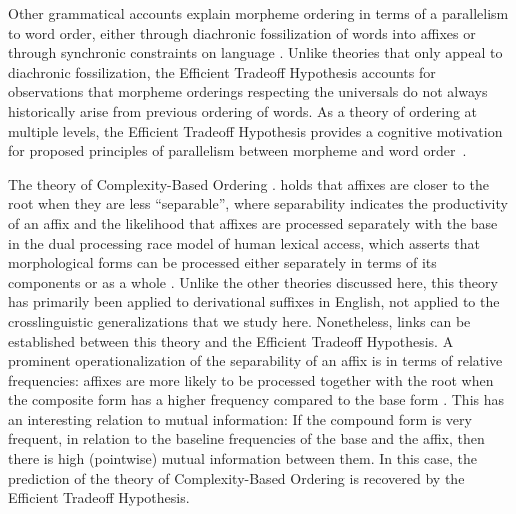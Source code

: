 \documentclass[11pt,letterpaper]{article}
\newcommand{\citep}{\parencite}
\newcommand{\citet}{\Textcite}
\newcommand\mhahn[1]{{\color{red}(#1)}}
\begin{document}





Other grammatical accounts explain morpheme ordering in terms of a parallelism to word order, either through diachronic fossilization of words into affixes or through synchronic constraints on language \citep{givon1971historical,venneman1973explanation,baker1985the}.
Unlike theories that only appeal to diachronic fossilization, the Efficient Tradeoff Hypothesis accounts for observations that morpheme orderings respecting the universals do not always historically arise from previous ordering of words.
As a theory of ordering at multiple levels, the Efficient Tradeoff Hypothesis  provides a cognitive motivation for proposed principles of parallelism between morpheme and word order~\citep{baker1985the}.



The theory of Complexity-Based Ordering \citep{hay2002speech,plag2002the,hay2004what,hay2005shifting,plag2009suffix}.
holds that affixes are closer to the root when they are less ``separable'', where separability indicates the productivity of an affix and the likelihood that affixes are processed separately with the base in the dual processing race model of human lexical access, which asserts that morphological forms can be processed either separately in terms of its components or as a whole  \citep{baayen1993on}.
Unlike the other theories discussed here, this theory has primarily been applied to derivational suffixes in English, not applied to the crosslinguistic generalizations that we study here.
Nonetheless, links can be established between this theory and the Efficient Tradeoff Hypothesis.
A prominent operationalization of the separability of an affix is in terms of relative frequencies:
affixes are more likely to be processed together with the root when the composite form has a higher frequency compared to the base form \citep{hay2001lexical}. %
This has an interesting relation to mutual information: 
If the compound form is very frequent, in relation to the baseline frequencies of the base and the affix, then there is high (pointwise) mutual information between them.
In this case, the prediction of the theory of Complexity-Based Ordering is recovered by the Efficient Tradeoff Hypothesis.
\end{document}
